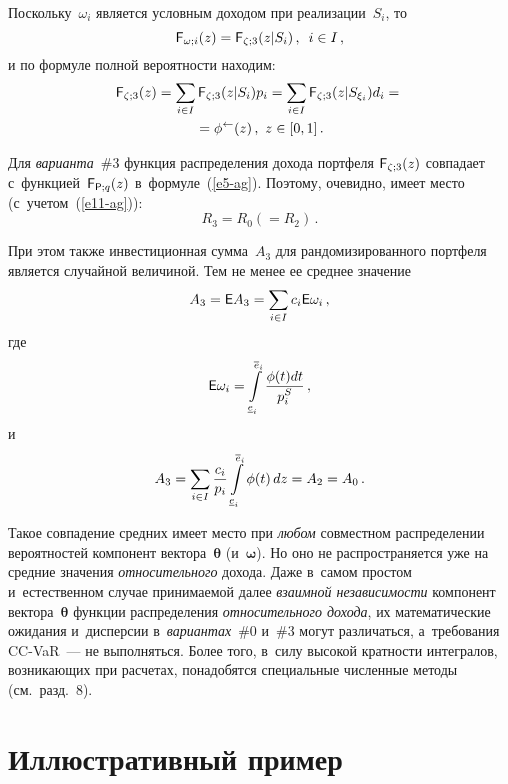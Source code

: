 \begin{multicols}{2}
  Поскольку~$\omega_i$ является условным доходом при реализации~$S_i$, 
  то 
  $$
  {\sf F}_{\omega; i}(z)= {\sf F}_{\zeta;3}(z\vert S_i)\,,\enskip i\in I\,,
  $$
и по формуле полной вероятности находим: 
\begin{multline*}
{\sf F}_{\zeta;3}(z)=\sum\limits_{i\in I}{\sf F}_{\zeta;3} (z\vert S_i) p_i
 =\sum\limits_{i\in I} {\sf F}_{\zeta;3}(z\vert 
S_{\xi_i})d_i={}\\
{}= \phi^{\leftarrow}(z)\,,\ z\in [0,1]\,.
\end{multline*}
  
  Для \textit{варианта}~\#3 функция распределения дохода портфеля ${\sf 
F}_{\zeta;3}(z)$ совпадает с~функцией~${\sf F}_{{\sf P};q}(z)$ 
в~формуле~(\ref{e5-ag}). Поэтому, очевидно, имеет место  
(с~учетом~(\ref{e11-ag})): 
  \begin{equation}
  R_3=R_0\left(=R_2\right)\,.
  \label{e14-ag}
  \end{equation}
  
  При этом также инвестиционная сумма~$A_3$ для рандомизированного 
портфеля является случайной величиной. Тем не менее ее среднее значение 
  $$
  A_3={\sf E} A_3 =\sum\limits_{i\in I} c_i {\sf E}\omega_i\,,
  $$
  где
  $$
  {\sf E} \omega_i =\int\limits_{\underline{e}_i}^{\overline{e}_i}
  \displaystyle\frac{\displaystyle \phi(t)dt\mathstrut}{\displaystyle p_i^S\mathstrut}\,,
  $$
  и
  \begin{equation}
  A_3=\sum\limits_{i\in I} \displaystyle\frac{\displaystyle c_i\mathstrut}{\displaystyle p_i\mathstrut} 
\int\limits_{\underline{e}_i}^{\overline{e}_i} \phi(t)\,dz =A_2=A_0\,.
  \label{e15-ag}
  \end{equation}
  
  Такое совпадение средних имеет место при \textit{любом} совместном 
распределении вероятностей компонент вектора~$\boldsymbol{\theta}$ 
(и~$\boldsymbol{\omega}$). Но оно не распространяется уже на средние 
значения \textit{относительного} дохода. Даже в~самом простом 
и~естественном случае принимаемой далее \textit{взаимной независимости} 
компонент вектора~$\boldsymbol{\theta}$ функции распределения 
\textit{относительного дохода}, их математические ожидания и~дисперсии 
в~\textit{вариантах}~\#0 и~\#3 могут различаться, а~требования CC-VaR~--- не 
выполняться. Более того, в~силу высокой кратности интегралов, возникающих 
при расчетах, понадобятся специальные численные методы (см.\ разд.~8). 
   
  \section{Иллюстративный пример}
  

\end{multicols}
